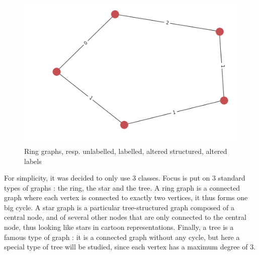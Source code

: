 \documentclass{article}
\theoremstyle{definition}
\begin{document}
\begin{figure}[!htb]
\begin{multicols}{4}
		\includegraphics[width=\linewidth]{data/generated-graphs/ring_altered_labels.png}\par
	\end{multicols}
	\caption{Ring graphs, resp. unlabelled, labelled, altered structured, altered labels}
\end{figure}
For simplicity, it was decided to only use 3 classes. Focus is put on 3 standard types of graphs : the ring, the star and the tree. A ring graph is a connected graph where each vertex is connected to exactly two vertices, it thus forms one big cycle. A star graph is a particular tree-structured graph composed of a central node, and of several other nodes that are only connected to the central node, thus looking like stars in cartoon representations. Finally, a tree is a famous type of graph : it is a connected graph without any cycle, but here a special type of tree will be studied, since each vertex has a maximum degree of 3.
\end{document}
